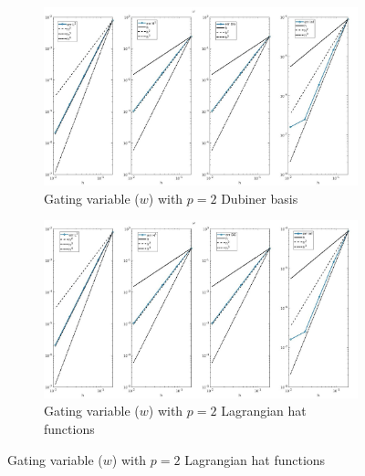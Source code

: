 \documentclass[a4paper,11pt]{article}
\begin{document}
\begin{figure}[H]
\caption{Comparison of the gating variable ($w$)}
\label{w_2}
\begin{subfigure}{\textwidth}
\begin{center}
\includegraphics[width = \textwidth]{./errors/D2_w_1.jpg}
\caption{Gating variable ($w$) with $p=2$ Dubiner basis}
\end{center}
\end{subfigure}
\begin{subfigure}{\textwidth}
\begin{center}
\includegraphics[width =\textwidth]{./errors/P2_w_1.jpg}
\caption{Gating variable ($w$) with $p=2$ Lagrangian hat functions}
\end{center}
\end{subfigure}
\end{figure}
\end{document}
